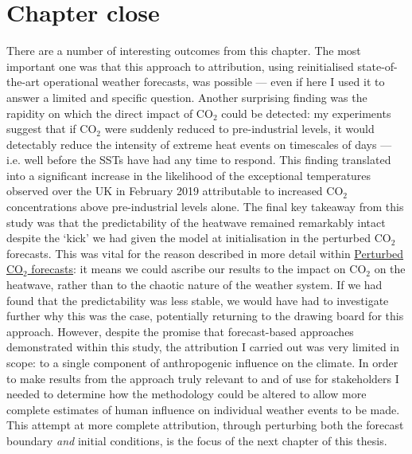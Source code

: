 \section{Chapter close}\label{ch3:close}

  There are a number of interesting outcomes from this chapter. The most important one was that this approach to attribution, using reinitialised state-of-the-art operational weather forecasts, was possible --- even if here I used it to answer a limited and specific question. Another surprising finding was the rapidity on which the direct impact of CO$_2$ could be detected: my experiments suggest that if CO$_2$ were suddenly reduced to pre-industrial levels, it would detectably reduce the intensity of extreme heat events on timescales of days --- i.e. well before the SSTs have had any time to respond. This finding translated into a significant increase in the likelihood of the exceptional temperatures observed over the UK in February 2019 attributable to increased CO$_2$ concentrations above pre-industrial levels alone. The final key takeaway from this study was that the predictability of the heatwave remained remarkably intact despite the `kick' we had given the model at initialisation in the perturbed CO$_2$ forecasts. This was vital for the reason described in more detail within \hyperref[ch3:experiments]{Perturbed CO$_2$ forecasts}: it means we could ascribe our results to the impact on CO$_2$ on the heatwave, rather than to the chaotic nature of the weather system. If we had found that the predictability was less stable, we would have had to investigate further why this was the case, potentially returning to the drawing board for this approach. However, despite the promise that forecast-based approaches demonstrated within this study, the attribution I carried out was very limited in scope: to a single component of anthropogenic influence on the climate. In order to make results from the approach truly relevant to and of use for stakeholders I needed to determine how the methodology could be altered to allow more complete estimates of human influence on individual weather events to be made. This attempt at more complete attribution, through perturbing both the forecast boundary \emph{and} initial conditions, is the focus of the next chapter of this thesis.